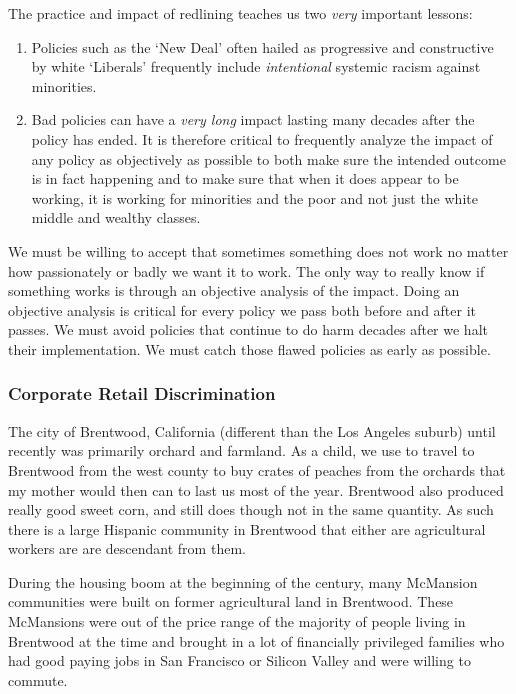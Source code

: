 The practice and impact of redlining teaches us two \emph{very} important lessons:

\begin{enumerate}
  \item Policies such as the `New Deal' often hailed as progressive and constructive by white `Liberals' frequently include \emph{intentional} systemic racism against minorities.
  \item Bad policies can have a \emph{very long} impact lasting many decades after the policy has ended. It is therefore critical to frequently analyze the impact of any policy as objectively as possible to both make sure the intended outcome is in fact happening and to make sure that when it does appear to be working, it is working for minorities and the poor and not just the white middle and wealthy classes.
\end{enumerate}

We must be willing to accept that sometimes something does not work no matter how passionately or badly we want it to work. The only way to really know if something works is through an objective analysis of the impact. Doing an objective analysis is critical for every policy we pass both before and after it passes. We must avoid policies that continue to do harm decades after we halt their implementation. We must catch those flawed policies as early as possible.

\subsubsection{Corporate Retail Discrimination}

The city of Brentwood, California (different than the Los Angeles suburb) until recently was primarily orchard and farmland. As a child, we use to travel to Brentwood from the west county to buy crates of peaches from the orchards that my mother would then can to last us most of the year. Brentwood also produced really good sweet corn, and still does though not in the same quantity. As such there is a large Hispanic community in Brentwood that either are agricultural workers are are descendant from them.

During the housing boom at the beginning of the century, many McMansion communities were built on former agricultural land in Brentwood. These McMansions were out of the price range of the majority of people living in Brentwood at the time and brought in a lot of financially privileged families who had good paying jobs in San Francisco or Silicon Valley and were willing to commute.

